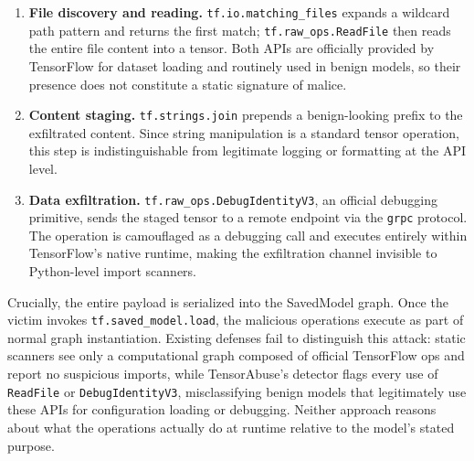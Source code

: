 \begin{enumerate}[leftmargin=*]
    \item \textbf{File discovery and reading.} \texttt{tf.io.matching\_files} expands a wildcard path pattern and returns the first match; \texttt{tf.raw\_ops.ReadFile} then reads the entire file content into a tensor. Both APIs are officially provided by TensorFlow for dataset loading and routinely used in benign models, so their presence does not constitute a static signature of malice.
    \item \textbf{Content staging.} \texttt{tf.strings.join} prepends a benign-looking prefix to the exfiltrated content. Since string manipulation is a standard tensor operation, this step is indistinguishable from legitimate logging or formatting at the API level.
    \item \textbf{Data exfiltration.} \texttt{tf.raw\_ops.DebugIdentityV3}, an official debugging primitive, sends the staged tensor to a remote endpoint via the \texttt{grpc} protocol. The operation is camouflaged as a debugging call and executes entirely within TensorFlow's native runtime, making the exfiltration channel invisible to Python-level import scanners.
\end{enumerate}

Crucially, the entire payload is serialized into the SavedModel graph. Once the victim invokes \texttt{tf.saved\_model.load}, the malicious operations execute as part of normal graph instantiation. Existing defenses fail to distinguish this attack: static scanners see only a computational graph composed of official TensorFlow ops and report no suspicious imports, while TensorAbuse's detector flags every use of \texttt{ReadFile} or \texttt{DebugIdentityV3}, misclassifying benign models that legitimately use these APIs for configuration loading or debugging. Neither approach reasons about what the operations actually do at runtime relative to the model's stated purpose.

